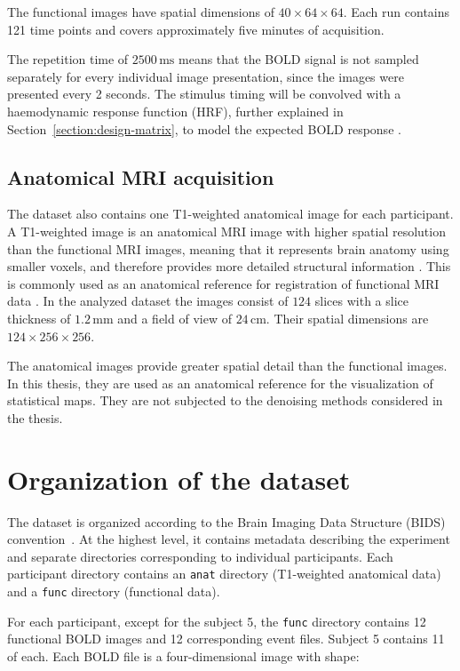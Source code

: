 \documentclass[english]{pwr_wmat_praca_dyplomowa}
\theoremstyle{definition}
\theoremstyle{remark}
\begin{document}
The functional images have spatial dimensions of $40 \times 64 \times 64$. Each run contains 121 time points and covers approximately five minutes of acquisition.

The repetition time of $2500 \, \mathrm{ms}$ means that the BOLD signal is not sampled separately for every individual image presentation, since the images were presented every 2 seconds. The stimulus timing will be convolved with a haemodynamic response function (HRF), further explained in Section~\ref{section:design-matrix}, to model the expected BOLD response \cite{hrf-problems}.

\subsection{Anatomical MRI acquisition}

The dataset also contains one T1-weighted anatomical image for each participant. A T1-weighted image is an anatomical MRI image with higher spatial resolution than the functional MRI images, meaning that it represents brain anatomy using smaller voxels, and therefore provides more detailed structural information \cite{fmri}. This is commonly used as an anatomical reference for registration of functional MRI data \cite{dataset-cit1, MAIN_DATASET}. In the analyzed dataset the images consist of $124$ slices with a slice thickness of $1.2 \, \mathrm{mm}$ and a field of view of $24 \, \mathrm{cm}$. Their spatial dimensions are $124 \times 256 \times 256$.

The anatomical images provide greater spatial detail than the functional images. In this thesis, they are used as an anatomical reference for the visualization of statistical maps. They are not subjected to the denoising methods considered in the thesis.

\section{Organization of the dataset}

The dataset is organized according to the Brain Imaging Data Structure (BIDS) convention~\cite{BIDS}. At the highest level, it contains metadata describing the experiment and separate directories corresponding to individual participants. Each participant directory contains an \verb|anat| directory (T1-weighted anatomical data) and a \verb|func| directory (functional data).

For each participant, except for the subject 5, the \verb|func| directory contains 12 functional BOLD images and 12 corresponding event files. Subject 5 contains 11 of each. Each BOLD file is a four-dimensional image with shape:
\end{document}
